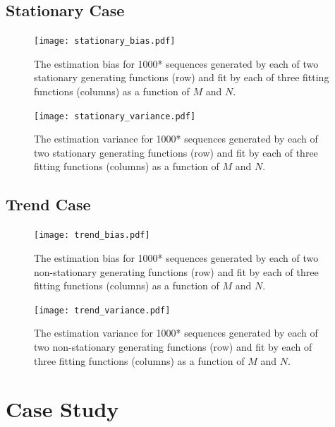 \documentclass[12pt]{article}
\begin{document}
\subsection{Stationary Case}

\begin{figure}[ht]
  \texttt{[image: stationary\_bias.pdf]}
  \caption{The estimation bias for 1000* sequences generated by each of two stationary generating functions (row) and fit by each of three fitting functions (columns) as a function of \(M\) and \(N\).\label{fig:stationary-bias}}
\end{figure}

\begin{figure}[ht]
  \texttt{[image: stationary\_variance.pdf]}
  \caption{The estimation variance for 1000* sequences generated by each of two stationary generating functions (row) and fit by each of three fitting functions (columns) as a function of \(M\) and \(N\).\label{fig:stationary-bias}}
\end{figure}


\subsection{Trend Case}

\begin{figure}[ht]
  \texttt{[image: trend\_bias.pdf]}
  \caption{The estimation bias for 1000* sequences generated by each of two non-stationary generating functions (row) and fit by each of three fitting functions (columns) as a function of \(M\) and \(N\).\label{fig:stationary-bias}}
\end{figure}

\begin{figure}[ht]
  \texttt{[image: trend\_variance.pdf]}
  \caption{The estimation variance for 1000* sequences generated by each of two non-stationary generating functions (row) and fit by each of three fitting functions (columns) as a function of \(M\) and \(N\).\label{fig:stationary-bias}}
\end{figure}

\section{Case Study}
\end{document}
